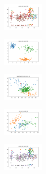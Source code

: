 \begin{figure}[H]
\begin{subfigure}
    \end{subfigure}
    \hfill
    \begin{subfigure}
        \centering
        \includegraphics[width=0.234\textwidth]{img/aggsf/ecoli_set_const_20_589741062_clust.png}
    \end{subfigure}
    \hfill
    \begin{subfigure}
        \centering
        \includegraphics[width=0.234\textwidth]{img/aggsf/rand_set_const_20_589741062_clust.png}
    \end{subfigure}
    \hfill
    \begin{subfigure}
        \centering
        \includegraphics[width=0.234\textwidth]{img/aggsf/newthyroid_set_const_20_589741062_clust.png}
    \end{subfigure}
    \hfill
    \begin{subfigure}
        \centering
        \includegraphics[width=0.234\textwidth]{img/aggsf/iris_set_const_20_277451237_clust.png}
    \end{subfigure}
    \hfill
    \begin{subfigure}
        \centering
        \includegraphics[width=0.234\textwidth]{img/aggsf/ecoli_set_const_20_277451237_clust.png}
    \end{subfigure}
    \hfill

\end{figure}
